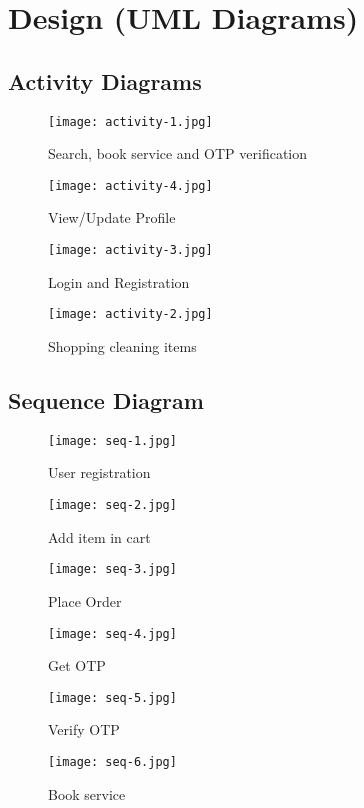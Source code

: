 \documentclass[conference]{IEEEtran}
\begin{document}
\newpage
\section{Design (UML Diagrams)}

\vspace{1cm}
\subsection{Activity Diagrams}
\begin{figure}[H]
    \centering
    \texttt{[image: activity-1.jpg]}
    \caption{Search, book service and OTP verification}
    \label{fig:activity1}
\end{figure}
\begin{figure}[H]
    \centering
    \texttt{[image: activity-4.jpg]}
    \caption{View/Update Profile}
    \label{fig:activity4}
\end{figure}
\begin{figure}[H]
    \centering
    \texttt{[image: activity-3.jpg]}
    \caption{Login and Registration}
    \label{fig:activity3}
\end{figure}
\begin{figure}[H]
    \centering
    \texttt{[image: activity-2.jpg]}
    \caption{Shopping cleaning items}
    \label{fig:activity2}
\end{figure}



\subsection{Sequence Diagram}
\begin{figure}[H]
    \centering
    \texttt{[image: seq-1.jpg]}
    \caption{User registration}
    \label{fig:seq1}
\end{figure}
\begin{figure}[H]
    \centering
    \texttt{[image: seq-2.jpg]}
    \caption{Add item in cart}
    \label{fig:seq2}
\end{figure}
\begin{figure}[H]
    \centering
    \texttt{[image: seq-3.jpg]}
    \caption{Place Order}
    \label{fig:seq3}
\end{figure}
\begin{figure}[H]
    \centering
    \texttt{[image: seq-4.jpg]}
    \caption{Get OTP}
    \label{fig:seq4}
\end{figure}
\begin{figure}[H]
    \centering
    \texttt{[image: seq-5.jpg]}
    \caption{Verify OTP}
    \label{fig:seq5}
\end{figure}
\begin{figure}[H]
    \centering
    \texttt{[image: seq-6.jpg]}
    \caption{Book service}
    \label{fig:seq6}
\end{figure}
\end{document}
